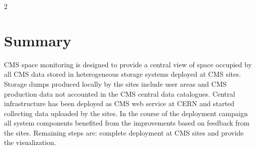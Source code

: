 2\section {Summary}

CMS space monitoring is designed to provide a central view of space occupied by 
all CMS data stored in heterogeneous storage systems deployed at CMS sites. 
Storage dumps produced locally by the sites include user areas and CMS production 
data not accounted in the CMS central data catalogues. Central infrastructure has 
been deployed as CMS web service at CERN and started collecting data uploaded by 
the sites. In the course of the deployment campaign all system components 
benefited from the improvements based on feedback from the sites. Remaining steps 
are: complete deployment at CMS sites and provide the visualization.
